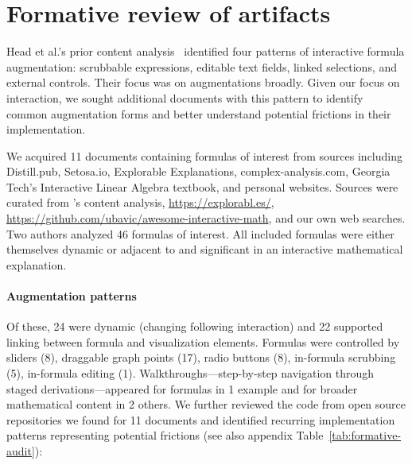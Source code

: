\section{Formative review of artifacts}\label{FormativeStudy}

Head et al.'s prior content analysis~\cite{Head2022-ws} identified four patterns of interactive formula augmentation: scrubbable expressions, editable text fields, linked selections, and external controls. Their focus was on augmentations broadly. Given our focus on interaction, we sought additional documents with this pattern to identify common augmentation forms and better understand potential frictions in their implementation.

We acquired 11 documents containing formulas of interest from sources including Distill.pub, Setosa.io, Explorable Explanations, complex-analysis.com, Georgia Tech's Interactive Linear Algebra textbook, and personal websites. Sources were curated from \citet{Head2022-ws}'s content analysis, \url{https://explorabl.es/}, \url{https://github.com/ubavic/awesome-interactive-math}, and our own web searches. Two authors analyzed 46 formulas of interest. All included formulas were either themselves dynamic or adjacent to and significant in an interactive mathematical explanation.

\paragraph{Augmentation patterns}
Of these, 24 were dynamic (changing following interaction) and 22 supported linking between formula and visualization elements. Formulas were controlled by sliders (8), draggable graph points (17), radio buttons (8), in-formula scrubbing (5), in-formula editing (1). Walkthroughs---step-by-step navigation through staged derivations---appeared for formulas in 1 example and for broader mathematical content in 2 others. We further reviewed the code from open source repositories we found for 11 documents and identified recurring implementation patterns representing potential frictions (see also appendix Table~\ref{tab:formative-audit}):

